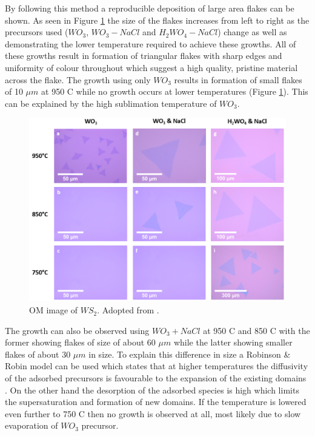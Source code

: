 By following this method a reproducible deposition of large area flakes can be shown. As seen in Figure \ref{fig:PaperOptical} the size of the flakes increases from left to right as the precursors used ($WO_3$, $WO_3-NaCl$ and $H_2WO_4-NaCl$) change as well as demonstrating the lower temperature required to achieve these growths. All of these growths result in formation of triangular flakes with sharp edges and uniformity of colour throughout which suggest a high quality, pristine material across the flake. 
The growth using only $WO_3$ results in formation of small flakes of 10 $\mu m$ at 950 {\degree}C while no growth occurs at lower temperatures (Figure \ref{fig:PaperOptical}). This can be explained by the high sublimation temperature of $WO_3$.

\begin{figure}[h]
	\begin{center}
		\includegraphics[scale=0.3]{PaperOptical.png}
		\caption{OM image of $WS_2$. Adopted from \cite{Reale2017}.}
		\label{fig:PaperOptical}
	\end{center}
\end{figure}

The growth can also be observed using $WO_3 + NaCl$ at 950 {\degree}C and 850 {\degree}C with the former showing flakes of size of about 60 $\mu m$ while the latter showing smaller flakes of about 30 $\mu m$ in size. To explain this difference in size a Robinson \& Robin model can be used which states that at higher temperatures the diffusivity of the adsorbed precursors is favourable to the expansion of the existing domains \cite{Kim2012}. On the other hand the desorption of the adsorbed species is high which limits the supersaturation and formation of new domains. If the temperature is lowered even further to 750 {\degree}C then no growth is observed at all, most likely due to slow evaporation of $WO_3$ precursor. 

